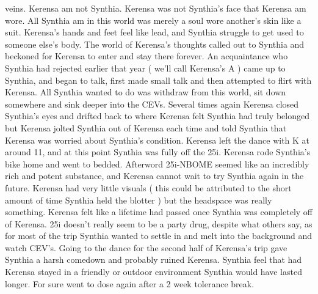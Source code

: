 \documentclass[12pt]{book}
\begin{document}
veins. Kerensa am not Synthia. Kerensa was not Synthia's face that Kerensa am wore. All Synthia am in this world was merely a soul wore another's skin like a suit. Kerensa's hands and feet feel like lead, and Synthia struggle to get used to someone else's body. The world of Kerensa's thoughts called out to Synthia and beckoned for Kerensa to enter and stay there forever. An acquaintance who Synthia had rejected earlier that year ( we'll call Kerensa's A ) came up to Synthia, and began to talk, first made small talk and then attempted to flirt with Kerensa. All Synthia wanted to do was withdraw from this world, sit down somewhere and sink deeper into the CEVs. Several times again Kerensa closed Synthia's eyes and drifted back to where Kerensa felt Synthia had truly belonged but Kerensa jolted Synthia out of Kerensa each time and told Synthia that Kerensa was worried about Synthia's condition. Kerensa left the dance with K at around 11, and at this point Synthia was fully off the 25i. Kerensa rode Synthia's bike home and went to bedded. Afterword 25i-NBOME seemed like an incredibly rich and potent substance, and Kerensa cannot wait to try Synthia again in the future. Kerensa had very little visuals ( this could be attributed to the short amount of time Synthia held the blotter ) but the headspace was really something. Kerensa felt like a lifetime had passed once Synthia was completely off of Kerensa. 25i doesn't really seem to be a party drug, despite what others say, as for most of the trip Synthia wanted to settle in and melt into the background and watch CEV's. Going to the dance for the second half of Kerensa's trip gave Synthia a harsh comedown and probably ruined Kerensa. Synthia feel that had Kerensa stayed in a friendly or outdoor environment Synthia would have lasted longer. For sure went to dose again after a 2 week tolerance break.
\end{document}
